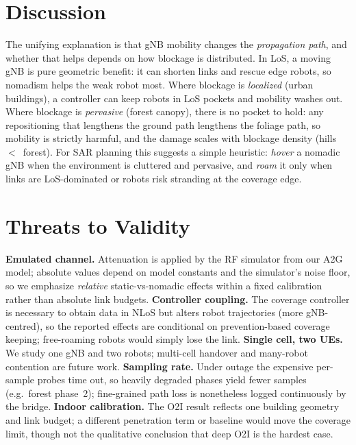 \documentclass[conference]{IEEEtran}
\begin{document}
\section{Discussion}
\label{sec:discussion}
The unifying explanation is that gNB mobility changes the \emph{propagation path},
and whether that helps depends on how blockage is distributed. In LoS, a moving
gNB is pure geometric benefit: it can shorten links and rescue edge robots, so
nomadism helps the weak robot most. Where blockage is \emph{localized} (urban
buildings), a controller can keep robots in LoS pockets and mobility washes out.
Where blockage is \emph{pervasive} (forest canopy), there is no pocket to hold:
any repositioning that lengthens the ground path lengthens the foliage path, so
mobility is strictly harmful, and the damage scales with blockage density
(hills~$<$~forest). For SAR planning this suggests a simple heuristic: \emph{hover}
a nomadic gNB when the environment is cluttered and pervasive, and \emph{roam} it
only when links are LoS-dominated or robots risk stranding at the coverage edge.

\section{Threats to Validity}
\label{sec:threats}
\textbf{Emulated channel.} Attenuation is applied by the RF simulator from our A2G
model; absolute values depend on model constants and the simulator's noise floor,
so we emphasize \emph{relative} static-vs-nomadic effects within a fixed
calibration rather than absolute link budgets. \textbf{Controller coupling.} The
coverage controller is necessary to obtain data in NLoS but alters robot
trajectories (more gNB-centred), so the reported effects are conditional on
prevention-based coverage keeping; free-roaming robots would simply lose the link.
\textbf{Single cell, two UEs.} We study one gNB and two robots; multi-cell
handover and many-robot contention are future work. \textbf{Sampling rate.} Under
outage the expensive per-sample probes time out, so heavily degraded phases yield
fewer samples (e.g.\ forest phase~2); fine-grained path loss is nonetheless logged
continuously by the bridge. \textbf{Indoor calibration.} The O2I result reflects
one building geometry and link budget; a different penetration term or baseline
would move the coverage limit, though not the qualitative conclusion that deep O2I
is the hardest case.
\end{document}
